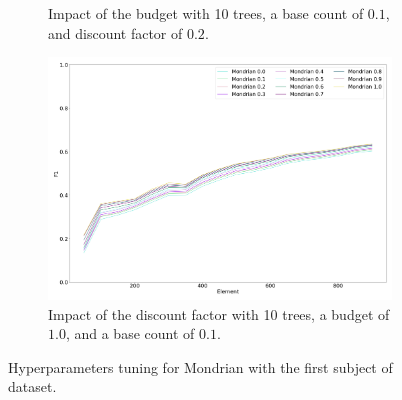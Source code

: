 \begin{figure}
\begin{subfigure}[b]{0.49\textwidth}
		 \caption{Impact of the budget with 10 trees, a base count of $0.1$, and discount factor of $0.2$.}
		 \label{fig:mondrian-budget}
	 \end{subfigure}
	 \hfill
	 \begin{subfigure}[b]{0.49\textwidth}
		 \centering
		 \includegraphics[width=\textwidth]{figures/calibration_mondrian_discount.png}
		 \caption{Impact of the discount factor with 10 trees, a budget of $1.0$, and a base count of $0.1$.}
		 \label{fig:mondrian-discount}
	 \end{subfigure}
		\caption{Hyperparameters tuning for Mondrian with the first subject of \banosdataset dataset.}
		\label{fig:mondrian-tuning}
\end{figure}



